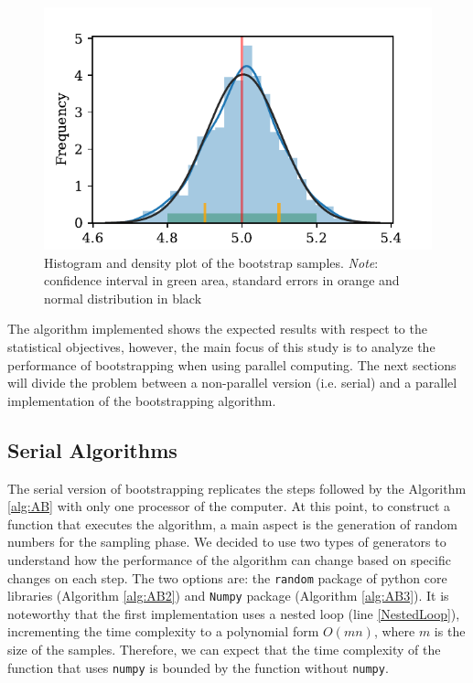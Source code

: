 \documentclass[11pt]{article}
\begin{document}
\begin{figure}[H]
    \begin{center}
        \includegraphics{mean_dist.pdf}
    \end{center}
    \caption{Histogram and density plot of the bootstrap samples. \textit{Note}:
    confidence interval in green area, standard errors in orange and normal distribution in black}\label{fig:BootsExample}
\end{figure}

\medskip

The algorithm implemented shows the expected results with respect to the statistical objectives, however, the main focus
of this study is to analyze the performance of bootstrapping when using parallel computing. The next sections will divide
the problem between a non-parallel version (i.e. serial) and a parallel implementation of the bootstrapping algorithm.

\subsection{Serial Algorithms}\label{subsec:serial-algorithms}

The serial version of bootstrapping replicates the steps followed by the Algorithm \ref{alg:AB} with only one processor
of the computer. At this point, to construct a function that executes the algorithm, a main aspect is the generation
of random numbers for the sampling phase. We decided to use two types of generators to understand how the performance of
the algorithm can change based on specific changes on each step. The two options are: the \texttt{random} package
of python core libraries (Algorithm \ref{alg:AB2}) and \texttt{Numpy} package (Algorithm \ref{alg:AB3}). It is noteworthy
that the first implementation uses a nested loop (line \ref{NestedLoop}), incrementing the time complexity to a polynomial
form $O(mn)$, where $m$ is the size of the samples. Therefore, we can expect that the time complexity of the function
that uses \texttt{numpy} is bounded by the function without \texttt{numpy}.
\end{document}
